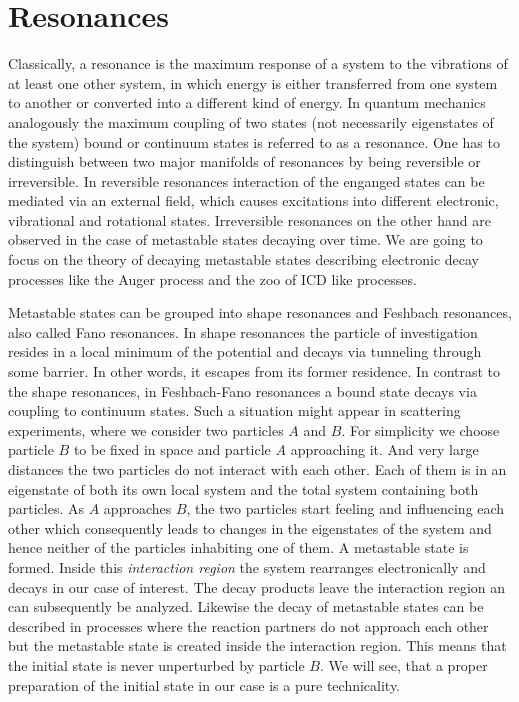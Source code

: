 \chapter{Resonances}

Classically, a resonance is the maximum response of a system to the vibrations
of at least one other
system, in which energy is either transferred from 
one system to another or converted into a different kind of energy.
In quantum mechanics analogously the maximum coupling 
of two states (not necessarily eigenstates of the system) 
bound or continuum states is referred to as a resonance.
One has to distinguish between two major manifolds of resonances
by being reversible or irreversible.
In reversible resonances
interaction of the enganged states can be mediated via an external field,
which causes excitations
into different electronic, vibrational and rotational states.
Irreversible resonances on the other hand are observed in the case of
metastable states decaying over time. We are going to focus on the theory of
decaying metastable states describing electronic decay processes like the
Auger process and the zoo of \ac{ICD} like processes. 

Metastable states can be grouped into shape resonances and Feshbach resonances,
also called Fano resonances. In shape resonances the particle of investigation
resides in
a local minimum of the potential and decays via tunneling through some barrier.
In other words, it escapes from its former residence.
In contrast to the shape resonances, in Feshbach-Fano resonances
a bound state decays via coupling to continuum states. Such a situation might
appear in scattering experiments, where we consider two particles $A$ and $B$.
For simplicity we choose particle $B$ to be fixed in space and particle $A$
approaching it. And very large distances the two particles do not interact with
each other. Each of them is in an eigenstate of both its own local system
and the total system containing both particles. As $A$ approaches $B$, the two
particles start feeling and influencing each other which consequently leads
to changes in the eigenstates of the system and hence neither of the particles
inhabiting one of them. A metastable state is formed. Inside this
\emph{interaction region} the system
rearranges electronically and decays in our case of interest. The decay
products leave the interaction region an can subsequently be analyzed.
Likewise the decay of metastable states can be described in processes
where the reaction partners do not approach each other but the metastable
state is created inside the interaction region. This means that the initial
state is never unperturbed by particle $B$. We will see, that a proper
preparation of the initial state in our case is a pure technicality.

